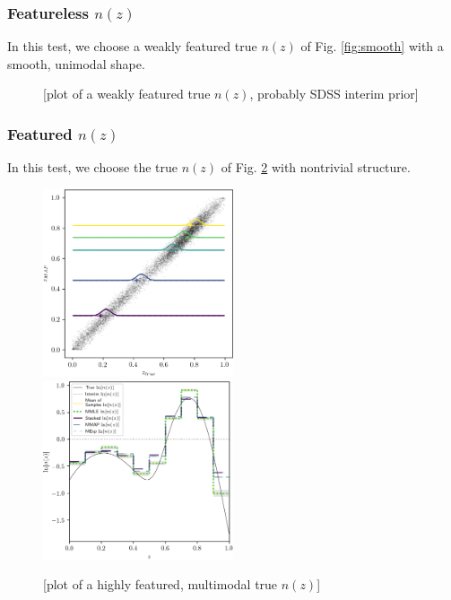 \documentclass[iop]{emulateapj}
\begin{document}
\subsubsection{Featureless $n(z)$}
\label{sec:smooth}

In this test, we choose a weakly featured true $n(z)$ of Fig. \ref{fig:smooth} 
with a smooth, unimodal shape.

\begin{figure}
	\begin{center}
		\caption{[plot of a weakly featured true $n(z)$, probably SDSS 
interim prior]}
		\label{fig:featured}
	\end{center}
\end{figure}

\subsubsection{Featured $n(z)$}
\label{sec:featured}

In this test, we choose the true $n(z)$ of Fig. \ref{fig:featured} with 
nontrivial structure.

\begin{figure}
	\begin{center}
		
\includegraphics[width=0.5\textwidth]{fig/fiducial/scatter.png}\\
		
\includegraphics[width=0.5\textwidth]{fig/fiducial/estimators.png}		
		\caption{[plot of a highly featured, multimodal true $n(z)$]}
		\label{fig:featured}
	\end{center}
\end{figure}
\end{document}
